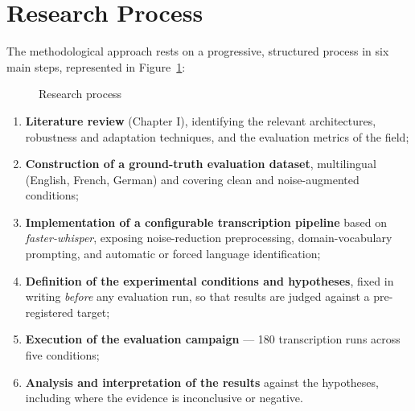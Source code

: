 \documentclass[12pt]{report}
\begin{document}
\section{Research Process}

The methodological approach rests on a progressive, structured process in six main steps, represented in Figure~\ref{fig:process}:

\begin{figure}[H]
\centering
{}
\caption{Research process}
\label{fig:process}
\end{figure}

\begin{enumerate}
    \item \textbf{Literature review} (Chapter I), identifying the relevant architectures, robustness and adaptation techniques, and the evaluation metrics of the field;
    \item \textbf{Construction of a ground-truth evaluation dataset}, multilingual (English, French, German) and covering clean and noise-augmented conditions;
    \item \textbf{Implementation of a configurable transcription pipeline} based on \textit{faster-whisper}, exposing noise-reduction preprocessing, domain-vocabulary prompting, and automatic or forced language identification;
    \item \textbf{Definition of the experimental conditions and hypotheses}, fixed in writing \emph{before} any evaluation run, so that results are judged against a pre-registered target;
    \item \textbf{Execution of the evaluation campaign} --- 180 transcription runs across five conditions;
    \item \textbf{Analysis and interpretation of the results} against the hypotheses, including where the evidence is inconclusive or negative.
\end{enumerate}
\end{document}
